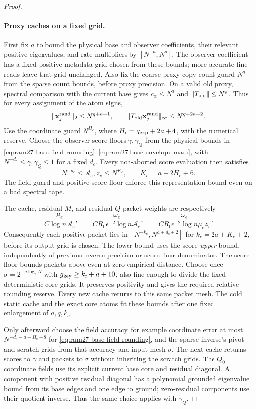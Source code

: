 \documentclass[11pt]{article}
\theoremstyle{remark}
\newcommand{\xxrand}{\mathbf{x}^{\mathrm{rand}}}
\newcommand{\norm}[1]{\lVert#1\rVert}
\begin{document}
\begin{proof}
\paragraph{Proxy caches on a fixed grid.}
First fix $a$ to bound the physical base and observer coefficients, their
relevant positive eigenvalues, and rate multipliers by $[N^{-a},N^a]$.
The observer coefficient has a fixed positive metadata grid chosen from these
bounds; more accurate fine reads leave that grid unchanged.
Also fix the coarse proxy copy-count guard $N^q$ from the sparse count bounds,
before proxy precision.
On a valid old proxy, spectral comparison with the current base gives
$c_\alpha\le N^a$ and $\norm{T_{\rm old}}\le N^a$.
Thus for every assignment of the atom signs,
\[
 \norm{\xxrand_j}_2\le N^{q+a+1},\qquad
 \norm{T_{\rm old}\xxrand_j}_\infty\le N^{q+2a+2}.
\]
Use the coordinate guard $N^{H_c}$, where $H_c=q_{\rm exp}+2a+4$, with the numerical
reserve.
Choose the observer score floors $\gamma,\gamma_Q$ from the physical bounds in
\eqref{eq:ram27-base-field-rounding}--\eqref{eq:ram27-base-envelope-mass}, with
$N^{-d_c}\le\gamma,\gamma_Q\le1$ for a fixed $d_c$.
Every non-aborted score evaluation then satisfies
\[
 N^{-d_c}\le\mathcal A_e,z_v\le N^{K_c},
 \qquad K_c=a+2H_c+6.
\]
The field guard and positive score floor enforce this representation bound even
on a bad spectral tape.

The cache, residual-$M$, and residual-$Q$ packet weights are respectively
\[
 \frac{\mu_e}{C\log n\mathcal A_e},\qquad
 \frac{\omega_e}{CR_0\epsilon^{-2}\log n\mathcal A_e},\qquad
 \frac{\omega_e}{CR_0\epsilon^{-2}\log n\mu_ez_v}.
\]
Consequently each positive packet lies in $[N^{-k_c},N^{a+d_c+2}]$ for
$k_c=2a+K_c+2$, before its output grid is chosen.
The lower bound uses the score \emph{upper} bound, independently of previous
inverse precision or score-floor denominator.
The score floor bounds packets above even at zero empirical distance.
Choose once $\sigma=2^{-g \log_2N }$ with $g_{\rm key}\ge k_c+a+10$, also fine
enough to divide the fixed deterministic core grids.
It preserves positivity and gives the required relative rounding reserve.
Every new cache returns to this same packet mesh.
The cold static cache and the exact core atoms fit these bounds after one fixed
enlargement of $a,q,k_c$.

Only afterward choose the field accuracy, for example coordinate error at most
$N^{-d_c-a-H_c-8}$ for \eqref{eq:ram27-base-field-rounding}, and the sparse
inverse's pivot and scratch grids from that accuracy and input mesh $\sigma$.
The next cache returns scores to $\gamma$ and packets to $\sigma$ without
inheriting the scratch grids.
The $Q_0$ coordinate fields use its explicit current base core and residual
diagonal.
A component with positive residual diagonal has a polynomial grounded eigenvalue
bound from its base edges and one edge to ground; zero-residual components use
their quotient inverse.
Thus the same choice applies with $\gamma_Q$.


\end{proof}
\end{document}
